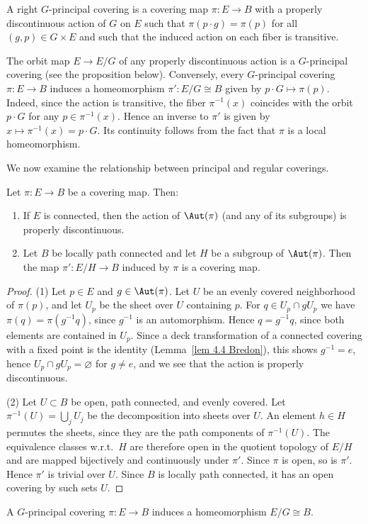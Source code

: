 \begin{defn}
    A right $G$-principal covering is a covering map $\pi:E\to B$ with a properly discontinuous action of $G$ on $E$ such that $\pi(p\cdot g)=\pi(p)$ for all $(g,p)\in G\times E$ and such that the induced action on each fiber is transitive.
\end{defn}

\begin{example}
    The orbit map $E\to E\slash G$ of any properly discontinuous action is a $G$-principal covering (see the proposition below). Conversely, every $G$-principal covering $\pi:E\to B$ induces a homeomorphism $\pi':E\slash G\cong B$ given by $p\cdot G\mapsto \pi(p)$. Indeed, since the action is transitive, the fiber $\pi^{-1}(x)$ coincides with the orbit $p\cdot G$ for any $p\in\pi^{-1}(x)$. Hence an inverse to $\pi'$ is given by $x\mapsto \pi^{-1}(x)=p\cdot G$. Its continuity follows from the fact that $\pi$ is a local homeomorphism.
\end{example}

We now examine the relationship between principal and regular coverings. 

\begin{prop}
    Let $\pi:E\to B$ be a covering map. Then:
    \begin{enumerate}[label=(\arabic*)]
        \item If $E$ is connected, then the action of $\Aut(\pi)$ (and any of its subgroups) is properly discontinuous.
        \item Let $B$ be locally path connected and let $H$ be a subgroup of $\Aut(\pi)$. Then the map $\pi':E\slash H\to B$ induced by $\pi$ is a covering map.
    \end{enumerate}
\end{prop}
\begin{proof}
    (1) Let $p\in E$ and $g\in \Aut(\pi)$. Let $U$ be an evenly covered neighborhood of $\pi(p)$, and let $U_p$ be the sheet over $U$ containing $p$. For $q\in U_p\cap gU_p$ we have $\pi(q)=\pi(g^{-1}q)$, since $g^{-1}$ is an automorphism. Hence $q=g^{-1}q$, since both elements are contained in $U_p$. Since a deck transformation of a connected covering with a fixed point is the identity (Lemma~\ref{lem 4.4 Bredon}), this shows $g^{-1}=e$, hence $U_p\cap gU_p=\varnothing$ for $g\neq e$, and we see that the action is properly discontinuous.

    (2) Let $U\subset B$ be open, path connected, and evenly covered. Let $\pi^{-1}(U)=\bigcup_j U_j$ be the decomposition into sheets over $U$. An element $h\in H$ permutes the sheets, since they are the path components of $\pi^{-1}(U)$. The equivalence classes w.r.t.\ $H$ are therefore open in the quotient topology of $E\slash H$ and are mapped bijectively and continuously under $\pi'$. Since $\pi$ is open, so is $\pi'$. Hence $\pi'$ is trivial over $U$. Since $B$ is locally path connected, it has an open covering by such sets $U$.
\end{proof}
\begin{cor}
    A $G$-principal covering $\pi:E\to B$ induces a homeomorphism $E\slash G\cong B$.
\end{cor}

